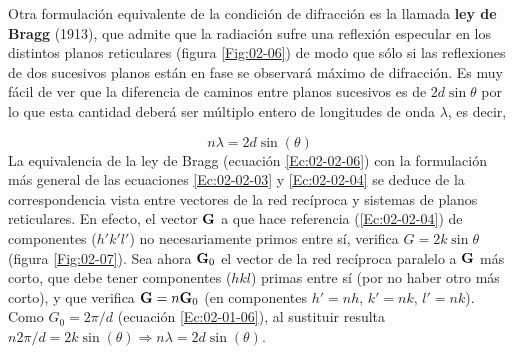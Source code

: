 Otra formulación equivalente de la condición de difracción es la llamada \textbf{ley de Bragg} (1913), que admite que la radiación sufre una reflexión especular en los distintos planos reticulares (figura \ref{Fig:02-06}) de modo que sólo si las reflexiones de dos sucesivos planos están en fase se observará máximo de difracción. Es muy fácil de ver que la diferencia de caminos entre planos sucesivos es de $2d\sin \theta$ por lo que esta cantidad deberá ser múltiplo entero de longitudes de onda $\lambda$, es decir,

\begin{equation}
    n \lambda = 2 d \sin (\theta) \label{Ec:02-02-06}
\end{equation}
La equivalencia de la ley de Bragg (ecuación \ref{Ec:02-02-06}) con la formulación más general de las ecuaciones \ref{Ec:02-02-03} y \ref{Ec:02-02-04} se deduce de la correspondencia vista entre vectores de la red recíproca y sistemas de planos reticulares. En efecto, el vector $\mathbf{G}$ a que hace referencia (\ref{Ec:02-02-04}) de componentes ($h' k' l'$) no necesariamente primos entre sí, verifica $G=2k\sin \theta$ (figura \ref{Fig:02-07}). Sea ahora $\mathbf{G}_0$ el vector de la red recíproca paralelo a $\mathbf{G}$ más corto, que debe tener componentes ($hkl$) primas entre sí (por no haber otro más corto), y que verifica $\mathbf{G} = n \mathbf{G}_0$ (en componentes $h'=nh$, $k'=nk$, $l'=nk$). Como $G_0 = 2\pi/d$ (ecuación \ref{Ec:02-01-06}), al sustituir resulta $n2\pi/d=2k\sin (\theta) \Rightarrow n \lambda = 2 d \sin (\theta)$. 
